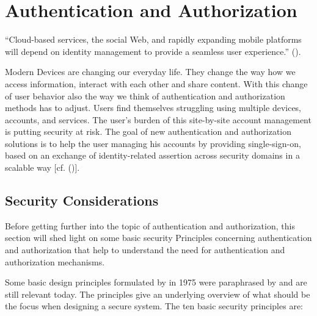 \chapter{Authentication and Authorization}\label{chap:authenticationandauthorization}

\chapterstart

“Cloud-based services, the social Web, and rapidly expanding mobile platforms will depend on identity management to provide a seamless user experience.”   (\citet{Corre:2017:WHI}).

Modern Devices are changing our everyday life. They change the way how we access information, interact with each other and share content. 
With this change of user behavior also the way we think of authentication and authorization methods has to adjust. Users find themselves struggling using multiple devices, accounts, and services. The user's burden of this site-by-site account management is putting security at risk. The goal of new authentication and authorization solutions is to help the user managing his accounts by providing single-sign-on, based on an exchange of identity-related assertion across security domains in a scalable way [cf. (\citet{Corre:2017:WHI})].  

\section{Security Considerations}

Before getting further into the topic of authentication and authorization, this section will shed light on some basic security Principles concerning authentication and authorization that help to understand the need for authentication and authorization mechanisms. 

Some basic design principles formulated by \cite{Saltzer:PICS} in 1975 were paraphrased by \cite{Neumann:2018:PTC} and are still relevant today. The principles give an underlying overview of what should be the focus when designing a secure system. The ten basic security principles are:

